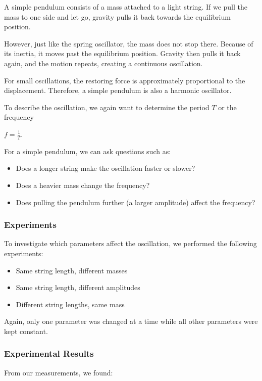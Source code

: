 A simple pendulum consists of a mass attached to a light string. If we pull the mass to one side and let go, gravity pulls it back towards the equilibrium position.

However, just like the spring oscillator, the mass does not stop there. Because of its inertia, it moves past the equilibrium position. Gravity then pulls it back again, and the motion repeats, creating a continuous oscillation.

For small oscillations, the restoring force is approximately proportional to the displacement. Therefore, a simple pendulum is also a harmonic oscillator.

To describe the oscillation, we again want to determine the period $T$ or the frequency

$
f=\frac{1}{T}.
$

For a simple pendulum, we can ask questions such as:

\begin{itemize}
    \item Does a longer string make the oscillation faster or slower?
    \item Does a heavier mass change the frequency?
    \item Does pulling the pendulum further (a larger amplitude) affect the frequency?
\end{itemize}

\subsubsection{Experiments}

To investigate which parameters affect the oscillation, we performed the following experiments:

\begin{itemize}
    \item Same string length, different masses
    \item Same string length, different amplitudes
    \item Different string lengths, same mass
\end{itemize}

Again, only one parameter was changed at a time while all other parameters were kept constant.

\subsubsection{Experimental Results}

From our measurements, we found:

